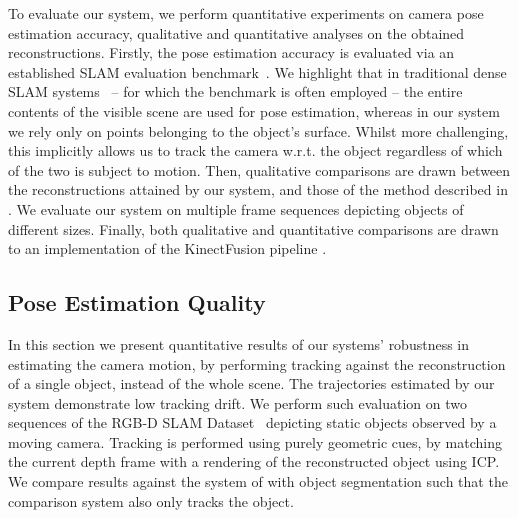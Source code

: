 To evaluate our system, we perform quantitative experiments on camera pose estimation accuracy, qualitative and quantitative analyses on the obtained reconstructions.
Firstly, the pose estimation accuracy is evaluated via an established SLAM evaluation benchmark~\cite{sturm12iros}.
We highlight that %
in traditional dense SLAM systems~\cite{Prisacariu2014,Niessner2013,Newcombe2011} -- for which the benchmark is often employed -- the entire contents of the visible scene are used for pose estimation, whereas in our system we rely only on points belonging to the object's surface.
Whilst more challenging, this implicitly allows us to track the camera w.r.t. the object regardless of which of the two is subject to motion.
Then, qualitative comparisons are drawn between the reconstructions attained by our system, and those of the method described in \cite{Ren2013}.
We evaluate our system on multiple frame sequences depicting objects of different sizes. %
Finally, both qualitative and quantitative comparisons are drawn to an implementation \cite{Prisacariu2014} of the KinectFusion pipeline \cite{Newcombe2011}.


\subsection{Pose Estimation Quality}
In this section we present quantitative results of our systems' %
robustness in estimating the camera motion, by performing tracking against the reconstruction of a single object, instead of the whole scene.
The trajectories estimated by our system demonstrate low tracking drift. %
We perform such evaluation on two sequences of the RGB-D SLAM Dataset~\cite{sturm12iros} depicting static objects observed by a moving camera.
Tracking is performed using purely geometric cues, by matching the current depth frame with a rendering of the reconstructed object using ICP. We compare results against the system of \cite{Prisacariu2014} 
with object segmentation such that the comparison system also only tracks the object.

